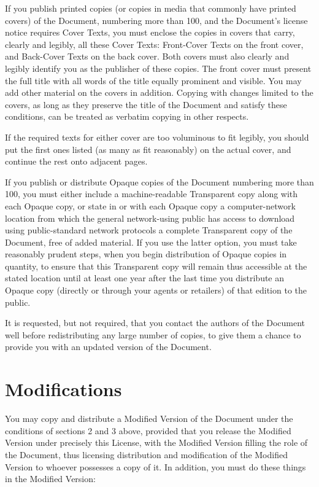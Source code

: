 \documentclass[12pt,a4paper,openany]{book}
\begin{document}
If you publish printed copies (or copies in media that commonly have
printed covers) of the Document, numbering more than 100, and the
Document’s license notice requires Cover Texts, you must enclose the
copies in covers that carry, clearly and legibly, all these Cover
Texts: Front-Cover Texts on the front cover, and Back-Cover Texts on
the back cover.  Both covers must also clearly and legibly identify
you as the publisher of these copies.  The front cover must present
the full title with all words of the title equally prominent and
visible.  You may add other material on the covers in addition.
Copying with changes limited to the covers, as long as they preserve
the title of the Document and satisfy these conditions, can be treated
as verbatim copying in other respects.

If the required texts for either cover are too voluminous to fit
legibly, you should put the first ones listed (as many as fit
reasonably) on the actual cover, and continue the rest onto adjacent
pages.

If you publish or distribute Opaque copies of the Document numbering
more than 100, you must either include a machine-readable Transparent
copy along with each Opaque copy, or state in or with each Opaque copy
a computer-network location from which the general network-using
public has access to download using public-standard network protocols
a complete Transparent copy of the Document, free of added material.
If you use the latter option, you must take reasonably prudent steps,
when you begin distribution of Opaque copies in quantity, to ensure
that this Transparent copy will remain thus accessible at the stated
location until at least one year after the last time you distribute an
Opaque copy (directly or through your agents or retailers) of that
edition to the public.

It is requested, but not required, that you contact the authors of the
Document well before redistributing any large number of copies, to give
them a chance to provide you with an updated version of the Document.

\section{Modifications}
\label{FDL:sec4}

You may copy and distribute a Modified Version of the Document under
the conditions of sections 2 and 3 above, provided that you release
the Modified Version under precisely this License, with the Modified
Version filling the role of the Document, thus licensing distribution
and modification of the Modified Version to whoever possesses a copy
of it.  In addition, you must do these things in the Modified Version:
\end{document}
